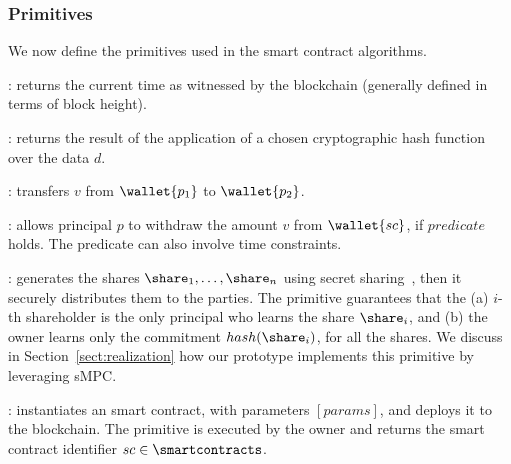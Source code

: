 \subsubsection*{Primitives}
We now define the primitives used in the \shortname smart contract algorithms.

\begin{asparaitem}
	\item \primtime: 
	returns the current time as witnessed by the blockchain (generally defined in terms of block height).
		
	\item {}: 
	returns the result of the application of a chosen cryptographic hash function over the data $d$.
	
	\item {}: 
	transfers $v$ from $\wallet{p_1}$ to $\wallet{p_2}$.
	
	\item {}:
	allows principal $p$ to withdraw the amount $v$ from $\wallet{sc}$, if $predicate$ holds. The predicate can also involve time constraints.
	
	\item \primgenerateshares{\secret}{[users]}: 
	generates the shares $\share_1, \ldots, \share_n$ using \KofN secret sharing~\cite{Shamir:1979:SS:359168.359176}, then it securely distributes them to the parties.
	The primitive guarantees that the (a) $i$-th shareholder is the only principal who learns the share $\share_i$, and (b) the owner learns only the commitment $hash(\share_i)$, for all the shares. 
	We discuss in Section~\ref{sect:realization} how our prototype implements this primitive by leveraging sMPC.	
	
	\item \priminit{[params]}: 
	instantiates an \shortname smart contract, with parameters $[params]$, and deploys it to the blockchain.
	The primitive is executed by the owner and returns the smart contract identifier $sc \in \smartcontracts$.

\end{asparaitem}


